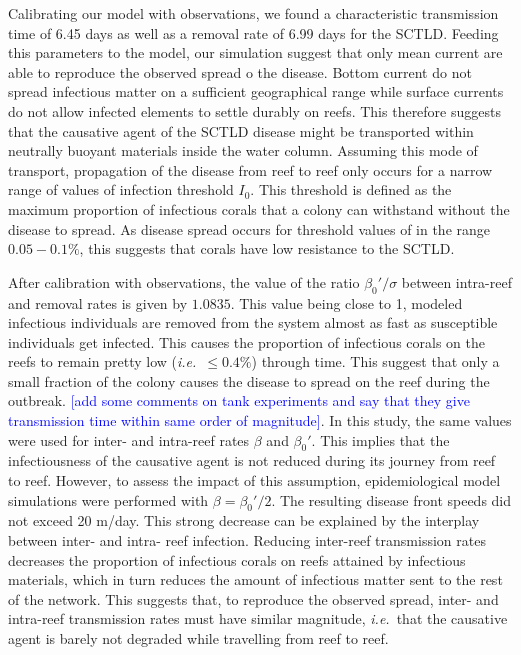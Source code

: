 \documentclass[utf8]{frontiersSCNS}
\newcommand{\ie}{{\it i.e.}\ }
\begin{document}
Calibrating our model with observations, we found a characteristic transmission time of 6.45 days as well as a removal rate of 6.99 days for the SCTLD. Feeding this parameters to the model, our simulation suggest that only mean current are able to reproduce the observed spread o the disease. Bottom current do not spread infectious matter on a sufficient geographical range while surface currents do not allow infected elements to settle durably on reefs. This therefore suggests that the causative agent of the SCTLD disease might be transported within neutrally buoyant materials inside the water column. Assuming this mode of transport, propagation of the disease from reef to reef only occurs for a narrow range of values of infection threshold $I_0$. This threshold is defined as the maximum proportion of infectious corals that a colony can withstand without the disease to spread. As disease spread occurs for threshold values of in the range $0.05-0.1\%$, this suggests that corals have low resistance to the SCTLD.


After calibration with observations, the value of the ratio $\beta_0'/\sigma$ between intra-reef and removal rates is given by $1.0835$. This value being close to 1, modeled infectious individuals are removed from the system almost as fast as susceptible individuals get infected. This causes the proportion of infectious corals on the reefs to remain pretty low (\ie $\leq 0.4\%$) through time. This suggest that only a small fraction of the colony causes the disease to spread on the reef during the outbreak. \textcolor{blue}{[add some comments on tank experiments and say that they give transmission time within same order of magnitude]}. In this study, the same values were used for inter- and intra-reef rates $\beta$ and $\beta_0'$. This implies that the infectiousness of the causative agent is not reduced during its journey from reef to reef. However, to assess the impact of this assumption, epidemiological model simulations were performed with $\beta=\beta_0'/2$. The resulting disease front speeds did not exceed 20 m/day. This strong decrease can be explained by the interplay between inter- and intra- reef infection. Reducing inter-reef transmission rates decreases the proportion of infectious corals on reefs attained by infectious materials, which in turn reduces the amount of infectious matter sent to the rest of the network. This suggests that, to reproduce the observed spread, inter- and intra-reef transmission rates must have similar magnitude, \ie that the causative agent is barely not degraded while travelling from reef to reef.
\end{document}
